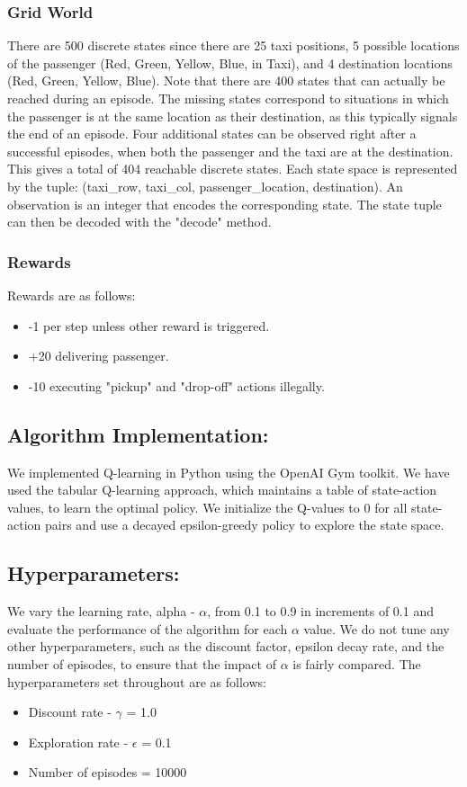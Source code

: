 \documentclass[conference]{IEEEtran}
\begin{document}
\subsubsection{Grid World}
There are 500 discrete states since there are 25 taxi positions, 5 possible locations of the passenger (Red, Green, Yellow, Blue, in Taxi), and 4 destination locations (Red, Green, Yellow, Blue). Note that there are 400 states that can actually be reached during an episode. The missing states correspond to situations in which the passenger is at the same location as their destination, as this typically signals the end of an episode. Four additional states can be observed right after a successful episodes, when both the passenger and the taxi are at the destination. This gives a total of 404 reachable discrete states. Each state space is represented by the tuple: (taxi\_row, taxi\_col, passenger\_location, destination). An observation is an integer that encodes the corresponding state. The state tuple can then be decoded with the "decode" method.
\newline
\subsubsection{Rewards}
Rewards are as follows:
\begin{itemize}
    \item -1 per step unless other reward is triggered.
    \item +20 delivering passenger.
    \item -10  executing "pickup" and "drop-off" actions illegally.
    \newline
\end{itemize}

\subsection{Algorithm Implementation:}
We implemented Q-learning in Python using the OpenAI Gym toolkit. We have used the tabular Q-learning approach, which maintains a table of state-action values, to learn the optimal policy. We initialize the Q-values to 0 for all state-action pairs and use a decayed epsilon-greedy policy to explore the state space. 

\subsection{Hyperparameters:}
We vary the learning rate, alpha - $\alpha$, from 0.1 to 0.9 in increments of 0.1 and evaluate the performance of the algorithm for each $\alpha$ value. We do not tune any other hyperparameters, such as the discount factor, epsilon decay rate, and the number of episodes, to ensure that the impact of $\alpha$ is fairly compared. The hyperparameters set throughout are as follows: 
\begin{itemize}
    \item Discount rate - $\gamma$ = 1.0
    \item Exploration rate - $\epsilon$ = 0.1
    \item Number of episodes = 10000
    \newline
\end{itemize} 
\end{document}

